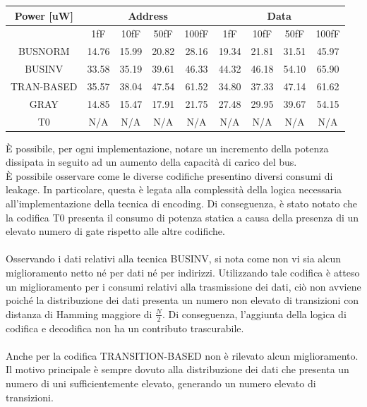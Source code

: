 \documentclass[11pt,  english, makeidx, a4paper, titlepage, oneside]{book}
\begin{document}
\begin{center}
	\begin{tabular}{|c|c|c|c|c|c|c|c|c|}
	\hline
	Power [uW] & \multicolumn{4}{c}{Address} & \multicolumn{4}{c}{Data}\\
	\hline
	 & 1fF & 10fF & 50fF & 100fF & 1fF & 10fF & 50fF & 100fF \\
	\hline
	BUSNORM & 14.76 & 15.99 & 20.82 & 28.16 & 19.34 & 21.81 & 31.51 & 45.97 \\
	 \hline
	BUSINV & 33.58 & 35.19 & 39.61 & 46.33 & 44.32 & 46.18 & 54.10 & 65.90 \\
	\hline
	TRAN-BASED & 35.57 & 38.04 & 47.54 & 61.52 & 34.80 & 37.33 & 47.14 & 61.62 \\
	\hline
	GRAY & 14.85 & 15.47 & 17.91 & 21.75 & 27.48 & 29.95 & 39.67 & 54.15 \\
	\hline
	T0 & N/A & N/A & N/A & N/A & N/A & N/A & N/A & N/A \\
	\hline
	\end{tabular}	
\end{center}
\vspace{0.3cm}
È possibile, per ogni implementazione, notare un incremento della potenza dissipata in seguito ad un aumento della capacità di carico del bus.
\\
È possibile osservare come le diverse codifiche presentino diversi consumi di leakage. In particolare, questa è legata alla complessità della logica necessaria all'implementazione della tecnica di encoding. Di conseguenza, è stato notato che la codifica T0 presenta il consumo di potenza statica a causa della presenza di un elevato numero di gate rispetto alle altre codifiche.
\\\\
Osservando i dati relativi alla tecnica BUSINV, si nota come non vi sia alcun miglioramento netto né per dati né per indirizzi. Utilizzando tale codifica è atteso un miglioramento per i consumi relativi alla trasmissione dei dati, ciò non avviene poiché la distribuzione dei dati presenta un numero non elevato di transizioni con distanza di Hamming maggiore di $\frac{N}{2}$. Di conseguenza, l'aggiunta della logica di codifica e decodifica non ha un contributo trascurabile.
\\\\
Anche per la codifica TRANSITION-BASED non è rilevato alcun miglioramento. Il motivo principale è sempre dovuto alla distribuzione dei dati che presenta un numero di uni sufficientemente elevato, generando un numero elevato di transizioni.
\\\\
\end{document}
